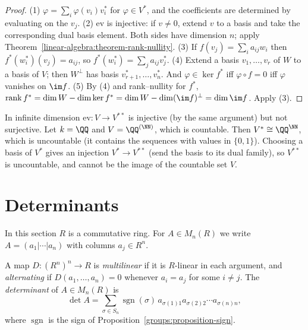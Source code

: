 \begin{proof}
(1) $\varphi = \sum_i \varphi(v_i)v_i^*$ for $\varphi \in V^*$, and the coefficients are determined by evaluating on
the $v_j$.
(2) $\mathrm{ev}$ is injective: if $v \neq 0$, extend $v$ to a basis and take the corresponding dual
basis element. Both sides have dimension $n$; apply
Theorem~\ref{linear-algebra:theorem-rank-nullity}.
(3) If $f(v_j) = \sum_i a_{ij}w_i$ then $f^*(w_i^*)(v_j) = a_{ij}$, so $f^*(w_i^*) = \sum_j a_{ij} v_j^*$.
(4) Extend a basis $v_1, \ldots, v_r$ of $W$ to a basis of $V$; then $W^\perp$ has basis
$v_{r+1}^*, \ldots, v_n^*$. And $\varphi \in \ker f^*$ iff $\varphi \circ f = 0$ iff $\varphi$ vanishes on $\im f$.
(5) By (4) and rank--nullity for $f^*$,
$\operatorname{rank} f^* = \dim W - \dim \ker f^* = \dim W - \dim(\im f)^\perp = \dim \im f$. Apply (3).
\end{proof}

\begin{counterexample}\label{linear-algebra:counterexample-double-dual}
In infinite dimension $\mathrm{ev} \colon V \to V^{**}$ is injective (by the same argument) but not
surjective. Let $k = \QQ$ and $V = \QQ^{(\NN)}$, which is countable. Then $V^* \cong \QQ^{\NN}$, which is
uncountable (it contains the sequences with values in $\{0, 1\}$). Choosing a basis of $V^*$ gives
an injection $V^* \to V^{**}$ (send the basis to its dual family), so $V^{**}$ is uncountable, and
cannot be the image of the countable set $V$.
\end{counterexample}

\section{Determinants}\label{linear-algebra:section-determinants}

In this section $R$ is a commutative ring. For $A \in M_n(R)$ we write $A = (a_1 | \cdots | a_n)$ with
columns $a_j \in R^n$.

\begin{definition}\label{linear-algebra:definition-alternating}
A map $D \colon (R^n)^n \to R$ is \emph{multilinear} if it is $R$-linear in each argument, and
\emph{alternating} if $D(a_1, \ldots, a_n) = 0$ whenever $a_i = a_j$ for some $i \neq j$. The
\emph{determinant} of $A \in M_n(R)$ is
\[
\det A = \sum_{\sigma \in S_n} \operatorname{sgn}(\sigma)\, a_{\sigma(1)1} a_{\sigma(2)2} \cdots a_{\sigma(n)n},
\]
where $\operatorname{sgn}$ is the sign of Proposition~\ref{groups:proposition-sign}.
\end{definition}

